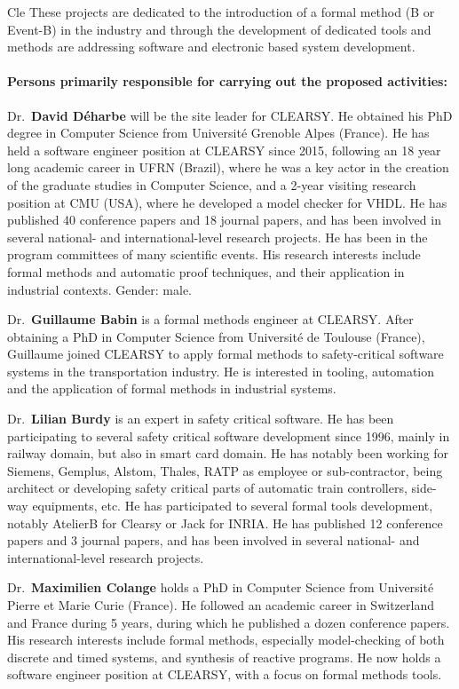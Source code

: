 \begin{sitedescription}{Cle}
These projects are dedicated to the introduction of a formal method (B or Event-B) in the industry and through the development
of dedicated tools and methods are addressing software and electronic based system development.

\paragraph{Persons primarily responsible for carrying out the proposed activities:}

Dr.\ \textbf{David Déharbe} will be the site leader for CLEARSY. He obtained his PhD degree in Computer Science from Université Grenoble Alpes 
(France). He has held a software engineer position at CLEARSY since 2015, following an 18 year long academic career in UFRN (Brazil), 
where he was a key actor in the creation of the graduate studies in Computer Science, and a 2-year visiting research position at CMU 
(USA), where he developed a model checker for VHDL. He has published 40 conference papers and 18 journal papers, and has been involved 
in several national- and international-level research projects. He has been in the program committees of many scientific events. His 
research interests include formal methods and automatic proof techniques, and their application in industrial contexts. Gender: male.

Dr.\ \textbf{Guillaume Babin} is a formal methods engineer at CLEARSY. After obtaining a PhD in Computer Science from Université de 
Toulouse (France), Guillaume joined CLEARSY to apply formal methods to safety-critical software systems in the transportation industry. 
He is interested in tooling, automation and the application of formal methods in industrial systems.

Dr.\ \textbf{Lilian Burdy} is an expert in safety critical software. He has been participating to several safety critical software 
development since 1996, mainly in railway domain, but also in smart card domain. He has notably been working for Siemens, Gemplus, 
Alstom, Thales, RATP as employee or sub-contractor, being architect or developing safety critical parts of automatic train controllers, 
side-way equipments, etc. He has participated to several formal tools development, notably AtelierB for Clearsy or Jack for INRIA. He 
has published 12 conference papers and 3 journal papers, and has been involved in several national- and international-level research 
projects.

Dr.\ \textbf{Maximilien Colange} holds a PhD in Computer Science from Université Pierre et Marie Curie (France). He followed an 
academic career in Switzerland and France during 5 years, during which he published a dozen conference papers. His research interests
include formal methods, especially model-checking of both discrete and timed systems, and synthesis of reactive programs. He now holds 
a software engineer position at CLEARSY, with a focus on formal methods tools.


\end{sitedescription}

